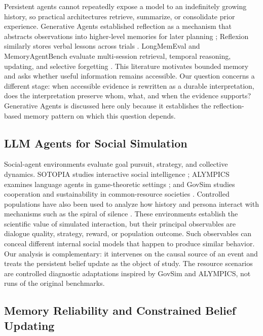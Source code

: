 \documentclass[sigconf,anonymous]{acmart}
\begin{document}
Persistent agents cannot repeatedly expose a model to an indefinitely growing
history, so practical architectures retrieve, summarize, or consolidate prior
experience. Generative Agents established reflection as a mechanism that
abstracts observations into higher-level memories for later planning
\cite{park2023generative}; Reflexion similarly stores verbal lessons across
trials \cite{shinn2023reflexion}. LongMemEval and MemoryAgentBench evaluate
multi-session retrieval, temporal reasoning, updating, and selective forgetting
\cite{wu2025longmemeval,hu2026memoryagentbench}. This literature motivates
bounded memory and asks whether useful information remains accessible. Our
question concerns a different stage: when accessible evidence is rewritten as
a durable interpretation, does the interpretation preserve whom, what, and when
the evidence supports? Generative Agents is discussed here only because it
establishes the reflection-based memory pattern on which this question depends.

\subsection{LLM Agents for Social Simulation}

Social-agent environments evaluate goal pursuit, strategy, and collective
dynamics. SOTOPIA studies interactive social intelligence
\cite{zhou2024sotopia}; ALYMPICS examines language agents in game-theoretic
settings \cite{mao2025alympics}; and GovSim studies cooperation and
sustainability in common-resource societies \cite{piatti2024cooperate}.
Controlled populations have also been used to analyze how history and persona
interact with mechanisms such as the spiral of silence
\cite{zhong2025spiral}. These environments establish the scientific value of
simulated interaction, but their principal observables are dialogue quality,
strategy, reward, or population outcome. Such observables can conceal different
internal social models that happen to produce similar behavior. Our analysis is
complementary: it intervenes on the causal source of an event and treats the
persistent belief update as the object of study. The resource scenarios are
controlled diagnostic adaptations inspired by GovSim and ALYMPICS, not runs of
the original benchmarks.

\subsection{Memory Reliability and Constrained Belief Updating}
\end{document}
